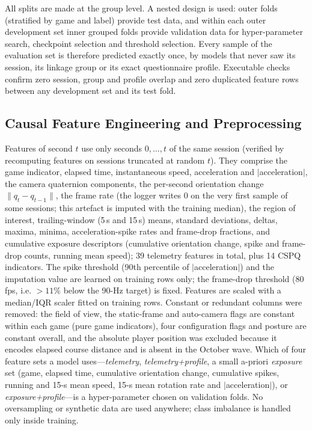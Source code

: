 All splits are made at the group level. A nested design is used: \nOuter{} outer folds (stratified by game and label) provide test data, and within each outer development set \nInner{} inner grouped folds provide validation data for hyper-parameter search, checkpoint selection and threshold selection. Every sample of the evaluation set is therefore predicted exactly once, by models that never saw its session, its linkage group or its exact questionnaire profile. Executable checks confirm zero session, group and profile overlap and zero duplicated feature rows between any development set and its test fold.

\subsection{Causal Feature Engineering and Preprocessing}
\label{sec:features}
Features of second $t$ use only seconds $0,\dots,t$ of the same session (verified by recomputing features on sessions truncated at random $t$). They comprise the game indicator, elapsed time, instantaneous speed, acceleration and $|$acceleration$|$, the camera quaternion components, the per-second orientation change $\lVert q_t-q_{t-1}\rVert$, the frame rate (the logger writes 0 on the very first sample of some sessions; this artefact is imputed with the training median), the region of interest, trailing-window (5\,s and 15\,s) means, standard deviations, deltas, maxima, minima, acceleration-spike rates and frame-drop fractions, and cumulative exposure descriptors (cumulative orientation change, spike and frame-drop counts, running mean speed); 39 telemetry features in total, plus 14 CSPQ indicators. The spike threshold (90th percentile of $|$acceleration$|$) and the imputation value are learned on training rows only; the frame-drop threshold (80\,fps, i.e. $>11\%$ below the 90-Hz target) is fixed. Features are scaled with a median/IQR scaler fitted on training rows. Constant or redundant columns were removed: the field of view, the static-frame and auto-camera flags are constant within each game (pure game indicators), four configuration flags and posture are constant overall, and the absolute player position was excluded because it encodes elapsed course distance and is absent in the October wave. Which of four feature sets a model uses---\emph{telemetry}, \emph{telemetry+profile}, a small a-priori \emph{exposure} set (game, elapsed time, cumulative orientation change, cumulative spikes, running and 15-s mean speed, 15-s mean rotation rate and $|$acceleration$|$), or \emph{exposure+profile}---is a hyper-parameter chosen on validation folds. No oversampling or synthetic data are used anywhere; class imbalance is handled only inside training.

